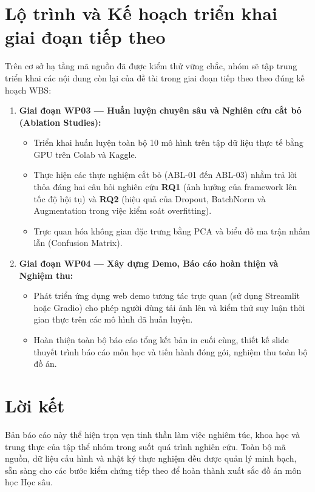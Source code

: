 \section{Lộ trình và Kế hoạch triển khai giai đoạn tiếp theo}
Trên cơ sở hạ tầng mã nguồn đã được kiểm thử vững chắc, nhóm sẽ tập trung triển khai các nội dung còn lại của đề tài trong giai đoạn tiếp theo theo đúng kế hoạch WBS:
\begin{enumerate}
\item \textbf{Giai đoạn WP03 — Huấn luyện chuyên sâu và Nghiên cứu cắt bỏ (Ablation Studies):}
\begin{itemize}
\item Triển khai huấn luyện toàn bộ 10 mô hình trên tập dữ liệu thực tế bằng GPU trên Colab và Kaggle.
\item Thực hiện các thực nghiệm cắt bỏ (ABL-01 đến ABL-03) nhằm trả lời thỏa đáng hai câu hỏi nghiên cứu \textbf{RQ1} (ảnh hưởng của framework lên tốc độ hội tụ) và \textbf{RQ2} (hiệu quả của Dropout, BatchNorm và Augmentation trong việc kiểm soát overfitting).
\item Trực quan hóa không gian đặc trưng bằng PCA và biểu đồ ma trận nhầm lẫn (Confusion Matrix).
\end{itemize}
\item \textbf{Giai đoạn WP04 — Xây dựng Demo, Báo cáo hoàn thiện và Nghiệm thu:}
\begin{itemize}
\item Phát triển ứng dụng web demo tương tác trực quan (sử dụng Streamlit hoặc Gradio) cho phép người dùng tải ảnh lên và kiểm thử suy luận thời gian thực trên các mô hình đã huấn luyện.
\item Hoàn thiện toàn bộ báo cáo tổng kết bản in cuối cùng, thiết kế slide thuyết trình báo cáo môn học và tiến hành đóng gói, nghiệm thu toàn bộ đồ án.
\end{itemize}
\end{enumerate}

\section{Lời kết}
Bản báo cáo này thể hiện trọn vẹn tinh thần làm việc nghiêm túc, khoa học và trung thực của tập thể nhóm trong suốt quá trình nghiên cứu. Toàn bộ mã nguồn, dữ liệu cấu hình và nhật ký thực nghiệm đều được quản lý minh bạch, sẵn sàng cho các bước kiểm chứng tiếp theo để hoàn thành xuất sắc đồ án môn học Học sâu.

